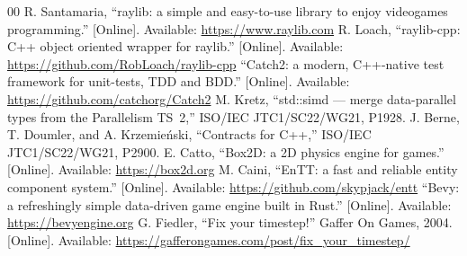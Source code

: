 \documentclass[conference]{IEEEtran}
\begin{document}
\begin{thebibliography}{00}
 R. Santamaria, ``raylib: a simple and easy-to-use library to enjoy
videogames programming.'' [Online]. Available: \url{https://www.raylib.com}
 R. Loach, ``raylib-cpp: C++ object oriented wrapper for raylib.''
[Online]. Available: \url{https://github.com/RobLoach/raylib-cpp}
 ``Catch2: a modern, C++-native test framework for unit-tests, TDD and
BDD.'' [Online]. Available: \url{https://github.com/catchorg/Catch2}
 M. Kretz, ``std::simd --- merge data-parallel types from the Parallelism
TS~2,'' ISO/IEC JTC1/SC22/WG21, P1928.
 J. Berne, T. Doumler, and A. Krzemie\'nski, ``Contracts for C++,''
ISO/IEC JTC1/SC22/WG21, P2900.
 E. Catto, ``Box2D: a 2D physics engine for games.'' [Online].
Available: \url{https://box2d.org}
 M. Caini, ``EnTT: a fast and reliable entity component system.''
[Online]. Available: \url{https://github.com/skypjack/entt}
 ``Bevy: a refreshingly simple data-driven game engine built in Rust.''
[Online]. Available: \url{https://bevyengine.org}
 G. Fiedler, ``Fix your timestep!'' Gaffer On Games, 2004. [Online].
Available: \url{https://gafferongames.com/post/fix_your_timestep/}
\end{thebibliography}
\end{document}
